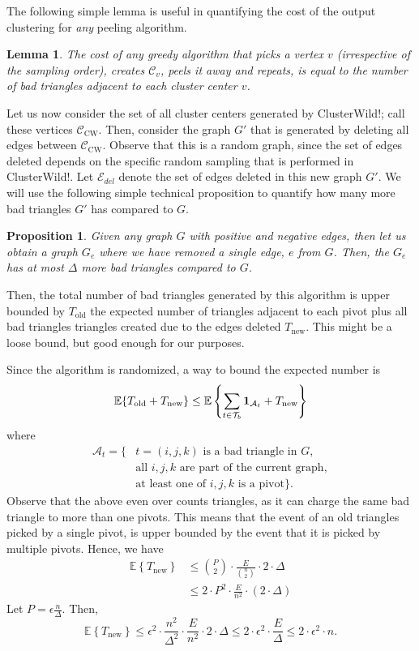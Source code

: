 \documentclass{article} %
\newtheorem{prop}{Proposition}
\newtheorem{lem}{Lemma}
\newcommand{\Tb}{\mathcal{T}_b}
\begin{document}
The following simple lemma is useful in quantifying the cost of the output clustering for {\it any} peeling algorithm.

\begin{lem}
The cost of any greedy algorithm that picks a vertex $v$  (irrespective of the sampling order), creates $\mathcal{C}_v$, peels it away and repeats, is equal to the number of bad triangles adjacent to each cluster center $v$.
\end{lem}


Let us now consider the set of all cluster centers generated by ClusterWild!; call these vertices $\mathcal{C}_{\text{CW}}$.
Then, consider the graph $G'$ that is generated by deleting all edges between $\mathcal{C}_{\text{CW}}$.
Observe that this is a random graph, since the set of edges deleted depends on the specific random sampling that is performed in ClusterWild!.
Let $\mathcal{E}_{del}$ denote the set of edges deleted in this new graph $G'$.
We will use the following simple technical proposition to quantify how many more bad triangles $G'$ has compared to $G$.

\begin{prop}
Given any graph $G$ with positive and negative edges, then let us obtain a graph $G_e$ where we have removed a single edge, $e$ from $G$.
Then, the $G_e$ has at most $\Delta$ more bad triangles compared to $G$.
\end{prop}


Then, the total number of bad triangles generated by this algorithm is upper bounded by $T_{\text{old}}$ the expected number of triangles adjacent to each pivot plus all bad triangles triangles created due to the edges deleted $T_{\text{new}}$.
This might be a loose bound, but good enough for our purposes.


Since the algorithm is randomized, a way to bound the expected number is
\begin{equation}
\mathbb{E}\{T_{\text{old}}+T_{\text{new}}\} \le \mathbb{E}\left\{\sum_{t\in\Tb} {\bf 1}_{\mathcal{A}_t}+T_{\text{new}}\right\}
\end{equation}
where
\begin{align*}
\mathcal{A}_t = \{&\text{$t=(i,j,k)$ is a bad triangle in $G$}, \\
&\text{all $i,j,k$ are part of the current graph}, \\
&\text{at least one of $i,j,k$ is a pivot}\}.
\end{align*}
Observe that the above even over counts triangles, as it can charge the same bad triangle to more than one pivots.
This means that the event of an old triangles picked by a single pivot, is upper bounded by the event that it is picked by multiple pivots.
Hence, we have
\begin{align}
\mathbb{E}\left\{T_{\text{new}}\right\}& \le {P\choose 2} \cdot \frac{E}{{n \choose 2}}\cdot 2\cdot \Delta \\
&\le 2\cdot P^2\cdot \frac{E}{n^2}\cdot (2\cdot \Delta)
\end{align}
Let $P= \epsilon \frac{n}{\Delta}$.
Then,
$$\mathbb{E}\left\{T_{\text{new}}\right\} \le \epsilon^2 \cdot \frac{n^2}{\Delta^2}\cdot  \frac{E}{n^2}\cdot 2\cdot \Delta
\le 2\cdot \epsilon^2\cdot \frac{E}{\Delta}
\le 2\cdot \epsilon^2 \cdot n.$$
\end{document}
